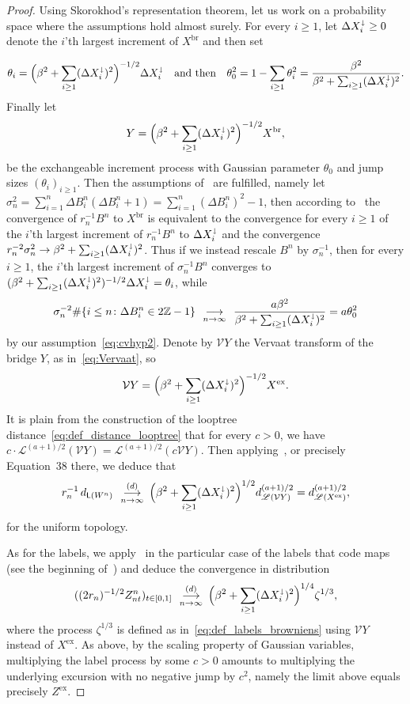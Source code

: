 \documentclass[british, a4paper,11pt]{article}
\numberwithin{equation}{section}
\theoremstyle{definition}
\newcommand{\Z}{\mathbb{Z}}
\newcommand{\Ver}{\mathcal{V}}
\newcommand{\Loop}{\mathscr{L}}
\newcommand{\Loopd}{\mathsf{L}}
\newcommand{\cv}[1][n]{\enskip\mathop{\longrightarrow}^{}_{#1 \to \infty}\enskip}
\newcommand{\cvloi}[1][n]{\enskip\mathop{\longrightarrow}^{(d)}_{#1 \to \infty}\enskip}
\newcommand{\exc}{\mathrm{ex}}
\newcommand{\br}{\mathrm{br}}
\begin{document}
\begin{proof}
Using Skorokhod's representation theorem, let us work on a probability space where the assumptions hold almost surely. 
For every $i \geq 1$, let $\Delta X^{\shortdownarrow}_i \geq 0$ denote the $i$'th largest increment of $X^{\br}$ and then set

\[\theta_i = \Bigl(\beta^2 + \sum_{i \geq 1} (\Delta X^{\shortdownarrow}_i)^2\Bigr)^{-1/2} \Delta X^{\shortdownarrow}_i
\quad\text{and then}\quad 
\theta_0^2 = 1 - \sum_{i \geq 1} \theta_i^2 
= \frac{\beta^2}{\beta^2 + \sum_{i \geq 1} (\Delta X^{\shortdownarrow}_i)^2}
.\]
Finally let 
\[Y = \Bigl(\beta^2 + \sum_{i \geq 1} (\Delta X^{\shortdownarrow}_i)^2\Bigr)^{-1/2} X^{\br},\]
be the exchangeable increment process with Gaussian parameter $\theta_0$ and jump sizes $(\theta_i)_{i \geq 1}$.
Then the assumptions of~\cite[Theorem~7.4]{Mar24} are fulfilled, namely let $\sigma^2_n = \sum_{i=1}^n \Delta B^n_i (\Delta B^n_i+1) = \sum_{i=1}^n (\Delta B^n_i)^2 - 1$, then according to~\cite[Theorem~16.23]{Kal02} the convergence of $r_n^{-1} B^n$ to $X^{\br}$ is equivalent to the convergence for every $i \geq 1$ of the $i$'th largest increment of $r_n^{-1} B^n$ to $\Delta X^{\shortdownarrow}_i$ and the convergence $r_n^{-2} \sigma_n^2 \to \beta^2 + \sum_{i \geq 1} (\Delta X^{\shortdownarrow}_i)^2$.
Thus if we instead rescale $B^n$ by $\sigma_n^{-1}$, then for every $i \geq 1$, the $i$'th largest increment of $\sigma_n^{-1} B^n$ converges to $(\beta^2 + \sum_{i \geq 1} (\Delta X^{\shortdownarrow}_i)^2)^{-1/2} \Delta X^{\shortdownarrow}_i = \theta_i$, while
\[
\sigma_n^{-2} \#\{i \leq n \colon \Delta B^n_i \in 2\Z-1\} 
\cv
\frac{a \beta^2}{\beta^2 + \sum_{i \geq 1} (\Delta X^{\shortdownarrow}_i)^2} = a \theta_0^2
\]
by our assumption~\eqref{eq:cvhyp2}.
Denote by $\Ver Y$ the Vervaat transform of the bridge $Y$, as in~\eqref{eq:Vervaat}, so
\[\Ver Y=\Bigl(\beta^2 + \sum_{i \geq 1} (\Delta X^{\shortdownarrow}_i)^2\Bigr)^{-1/2} X^{\exc}.\]
It is plain from the construction of the looptree distance~\eqref{eq:def_distance_looptree} that for every $c>0$, we have $c\cdot \Loop^{(a+1)/2}(\Ver Y) = \Loop^{(a+1)/2}(c \Ver Y)$.
Then applying~\cite[Theorem~7.4]{Mar24}, or precisely Equation~38 there, we deduce that
\[r_{n}^{-1}\, d_{\Loopd(W^{n})}
\cvloi
\Bigl(\beta^2 + \sum_{i \geq 1} (\Delta X^{\shortdownarrow}_i)^2\Bigr)^{1/2} d^{(a+1)/2}_{\Loop(\Ver Y)}
= d^{(a+1)/2}_{\Loop(X^{\exc})}
,\]
for the uniform topology.

As for the labels, we apply~\cite[Theorem~7.9]{Mar24} in the particular case of the labels that code maps (see the beginning of~\cite[Section~7.4]{Mar24}) and deduce the convergence in distribution
\[((2r_n)^{-1/2} Z^n_{n t})_{t \in [0,1]} \cvloi \Bigl(\beta^2 + \sum_{i \geq 1} (\Delta X^{\shortdownarrow}_i)^2 \Bigr)^{1/4} \zeta^{1/3},\]
where the process $\zeta^{1/3}$ is defined as in~\eqref{eq:def_labels_browniens} using $\Ver Y$ instead of $X^{\exc}$.
As above, by the scaling property of Gaussian variables, multiplying the label process by some $c>0$ amounts to multiplying the underlying excursion with no negative jump by $c^2$, namely the limit above equals precisely $Z^{\exc}$.
\end{proof}
\end{document}
